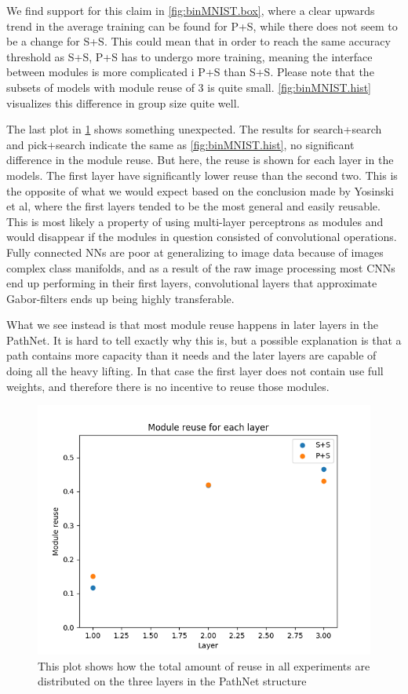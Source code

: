 We find support for this claim in \ref{fig:binMNIST.box}, where a clear upwards trend in the average training can be found for P+S, while there does not seem to be a change for S+S. This could mean that in order to reach the same accuracy threshold as S+S, P+S has to undergo more training, meaning the interface between modules is more complicated i P+S than S+S. Please note that the subsets of models with module reuse of 3 is quite small. \ref{fig:binMNIST.hist} visualizes this difference in group size quite well.

The last plot in \ref{fig:binMNIST.layer_reuse} shows something unexpected. The results for search+search and pick+search indicate the same as \ref{fig:binMNIST.hist}, no significant difference in the module reuse. But here, the reuse is shown for each layer in the models. The first layer have significantly lower reuse than the second two. This is the opposite of what we would expect based on the conclusion made by Yosinski et al\cite{yosinski2014transferable}, where the first layers tended to be the most general and easily reusable. This is most likely a property of using multi-layer perceptrons as modules and would disappear if the modules in question consisted of convolutional operations. Fully connected NNs are poor at generalizing to image data because of images complex class manifolds, and as a result of the raw image processing most CNNs end up performing in their first layers, convolutional layers that approximate Gabor-filters ends up being highly transferable.

What we see instead is that most module reuse happens in later layers in the PathNet. It is hard to tell exactly why this is, but a possible explanation is that a path contains more capacity than it needs and the later layers are capable of doing all the heavy lifting. In that case the first layer does not contain use full weights, and therefore there is no incentive to reuse those modules. 

\begin{figure}[t]
    \includegraphics[width=\textwidth]{Chapters/4.Experiments/exp1/figures/600binMNIST_reuse_by_layer.png}
    \caption{This plot shows how the total amount of reuse in all experiments are distributed on the three layers in the PathNet structure }
    \label{fig:binMNIST.layer_reuse}
\end{figure}

